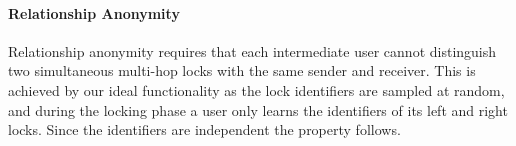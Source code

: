 \paragraph{Relationship Anonymity} Relationship anonymity requires that each intermediate user 
cannot distinguish two simultaneous multi-hop locks with the same sender and receiver. This is 
achieved by our ideal functionality as the lock identifiers are sampled at random, and during 
the locking phase a user only learns the identifiers of its left and right locks. Since the 
identifiers are independent the property follows.

